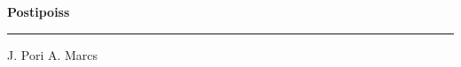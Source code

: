 \documentclass[10pt]{book}
\begin{document}
{
  \samepage
  \raggedbottom
  \raggedright
  \sloppy


  \vspace{0.2in}

  \noindent\begin{minipage}{.1\textwidth}
    \hfill\vspace{0.1in}
  \end{minipage}%
  \noindent\begin{minipage}{.8\textwidth}
    \centering
    \bfseries
    \large Postipoiss
  \end{minipage}%
  \noindent\begin{minipage}{.1\textwidth}
      \hfill\vspace{0.1in}
  \end{minipage}

  \nopagebreak[4]
  \vspace{0.1in}
  \nopagebreak[4]
  \hrule height 0.05ex
  \nopagebreak[4]
  \vspace{-0.05in}

  {\footnotesize J. Pori \hfill A. Marcs }\\
  \vspace{0.01in}



}
\end{document}
